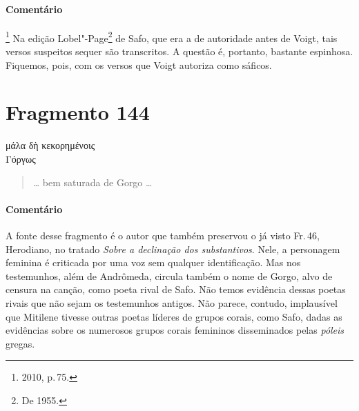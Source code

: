 
\paragraph{Comentário} \footnote{2010, p.\,75.} Na edição Lobel"-Page\footnote{De 1955.} de Safo, que era a de autoridade antes de Voigt, tais versos suspeitos sequer são transcritos. A questão é, portanto, bastante espinhosa. Fiquemos, pois, com os versos que Voigt autoriza como sáficos.

\pagebreak
\section{Fragmento 144}

\begin{gkverse}
μάλα δὴ κεκορημένοις\\
Γόργως
\end{gkverse}

\begin{verse}
\ldots{} bem saturada de Gorgo \ldots{}
\end{verse}

\medskip

{\paragraph{Comentário} A fonte desse fragmento é o autor que também preservou o já visto Fr.\,46, Herodiano, no tratado
\textit{Sobre a declinação dos substantivos}. Nele, a personagem feminina é
criticada por uma voz sem qualquer identificação. Mas nos testemunhos, além de Andrômeda, circula também o nome de Gorgo, alvo de censura na canção, como poeta rival de Safo. Não temos evidência dessas poetas rivais que não sejam os testemunhos antigos. Não parece, contudo, implausível que Mitilene tivesse outras poetas líderes de grupos corais, como Safo, dadas as evidências sobre os numerosos  grupos corais femininos disseminados pelas \textit{póleis} gregas.}

